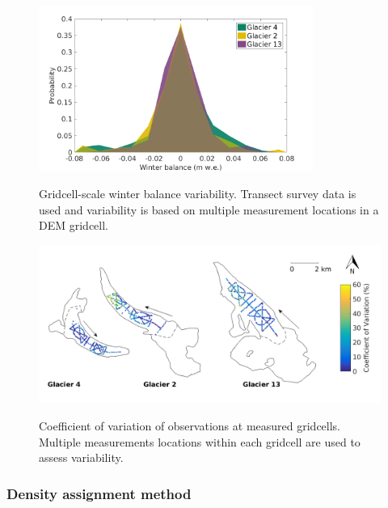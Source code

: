 \documentclass{sfuthesis}
\begin{document}
\begin{figure}[H]
	\centering
	\includegraphics[width =0.8\textwidth]{SWEvarMeasureLocHIST.png}\\
	\caption{Gridcell-scale winter balance variability. Transect survey data is used and variability is based on multiple measurement locations in a DEM gridcell.}
	\label{fig:SWEvar_MultLoc_hist}
\end{figure}

\begin{figure}[H]
	\centering
	\includegraphics[width =\textwidth]{Map_cellstd_measureLoc.png}\\
	\caption{Coefficient of variation of observations at measured gridcells. Multiple measurements locations within each gridcell are used to assess variability.}
	\label{fig:SWEvar_MultLoc_map}
\end{figure}



\subsubsection{Density assignment method}
\end{document}
